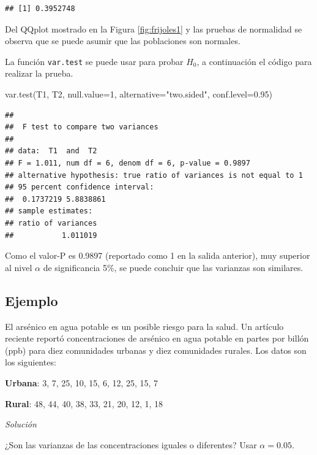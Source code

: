 \documentclass[
]{book}
\makeatletter
\newenvironment{Shaded}{\begin{snugshade}}{\end{snugshade}}
\newcommand{\AttributeTok}[1]{\textcolor[rgb]{0.77,0.63,0.00}{#1}}
\newcommand{\DecValTok}[1]{\textcolor[rgb]{0.00,0.00,0.81}{#1}}
\newcommand{\FloatTok}[1]{\textcolor[rgb]{0.00,0.00,0.81}{#1}}
\newcommand{\FunctionTok}[1]{\textcolor[rgb]{0.00,0.00,0.00}{#1}}
\newcommand{\NormalTok}[1]{#1}
\newcommand{\StringTok}[1]{\textcolor[rgb]{0.31,0.60,0.02}{#1}}
\newenvironment{kframe}{%
\medskip{}
\setlength{\fboxsep}{.8em}
 \def\at@end@of@kframe{}%
 \ifinner\ifhmode%
  \def\at@end@of@kframe{\end{minipage}}%
  \begin{minipage}{\columnwidth}%
 \fi\fi%
 \def\FrameCommand##1{\hskip\@totalleftmargin \hskip-\fboxsep
 \colorbox{shadecolor}{##1}\hskip-\fboxsep
     \hskip-\linewidth \hskip-\@totalleftmargin \hskip\columnwidth}%
 \MakeFramed {\advance\hsize-\width
   \@totalleftmargin\z@ \linewidth\hsize
   \@setminipage}}%
 {\par\unskip\endMakeFramed%
 \at@end@of@kframe}
\renewenvironment{Shaded}{\begin{kframe}}{\end{kframe}}
\makeatother
\begin{document}
\begin{verbatim}
## [1] 0.3952748
\end{verbatim}

Del QQplot mostrado en la Figura \ref{fig:frijoles1} y las pruebas de normalidad se observa que se puede asumir que las poblaciones son normales.

La función \texttt{var.test} se puede usar para probar \(H_0\), a continuación el código para realizar la prueba.

\begin{Shaded}
\begin{Highlighting}[]
\FunctionTok{var.test}\NormalTok{(T1, T2, }\AttributeTok{null.value=}\DecValTok{1}\NormalTok{, }\AttributeTok{alternative=}\StringTok{"two.sided"}\NormalTok{,}
         \AttributeTok{conf.level=}\FloatTok{0.95}\NormalTok{)}
\end{Highlighting}
\end{Shaded}

\begin{verbatim}
## 
##  F test to compare two variances
## 
## data:  T1  and  T2
## F = 1.011, num df = 6, denom df = 6, p-value = 0.9897
## alternative hypothesis: true ratio of variances is not equal to 1
## 95 percent confidence interval:
##  0.1737219 5.8838861
## sample estimates:
## ratio of variances 
##           1.011019
\end{verbatim}

Como el valor-P es 0.9897 (reportado como 1 en la salida anterior), muy superior al nivel \(\alpha\) de significancia 5\%, se puede concluir que las varianzas son similares.

\hypertarget{ejemplo-70}{%
\subsection*{Ejemplo}\label{ejemplo-70}}

El arsénico en agua potable es un posible riesgo para la salud. Un artículo reciente reportó concentraciones de arsénico en agua potable en partes por billón (ppb) para diez comunidades urbanas y diez comunidades rurales. Los datos son los siguientes:

\textbf{Urbana}: 3, 7, 25, 10, 15, 6, 12, 25, 15, 7

\textbf{Rural}: 48, 44, 40, 38, 33, 21, 20, 12, 1, 18

\emph{Solución}

¿Son las varianzas de las concentraciones iguales o diferentes? Usar \(\alpha=0.05\).
\end{document}
